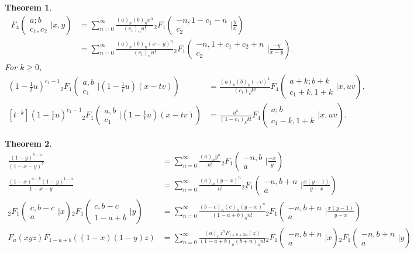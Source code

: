 \documentclass[12pt]{article}
\numberwithin{equation}{section}
\newtheorem{theorem}{Theorem}[section]
\newcommand{\Head}[3] {{}_{#1}{#2}_{#3}}
\newcommand{\ArgS}[3] {( \begin{smallmatrix} #1 \\ #2 \end{smallmatrix} | {#3})}
\newcommand{\HypJ}[2] {F_{#1}(#2)}
\newcommand{\appellFfourS}[6]    {F_4 \ArgS{{#1};{#2}}{{#3},{#4}}{{#5},{#6}}}
\begin{document}
\begin{theorem}
\label{thm_appelF4_sum}
\begin{align*}
\appellFfourS{a}{b}{c_1}{c_2}{x}{y} &= \sum_{n=0}^{\infty} \tfrac{(a)_n (b)_n x^n}{(c_1)_n n!} \Head2F1 \ArgS{-n,1-c_1-n}{c_2}{\tfrac{y}{x}}\\
 &= \sum_{n=0}^{\infty} \tfrac{(a)_n (b)_n (x-y)^n}{(c_1)_n n!} \Head2F1 \ArgS{-n,1+c_1+c_2+n}{c_2}{\tfrac{-y}{x-y}}\text{.}
\end{align*}
For $k \ge 0$,
\begin{align*}
[t^{k}] (1- \tfrac1t u)^{c_1-1} \Head2F1 \ArgS{a,b}{c_1}{(1-\tfrac1t u)(x-t v)} &= \tfrac{(a)_k (b)_k (-v)^k}{(c_1)_k k!} \appellFfourS{a+k}{b+k}{c_1+k}{1+k}{x}{u v}\text{,}\\
[t^{-k}] (1-\tfrac1t u)^{c_1-1} \Head2F1 \ArgS{a,b}{c_1}{(1-\tfrac1t u)(x-t v)} &= \tfrac{u^k}{(1-c_1)_k k!} \appellFfourS{a}{b}{c_1-k}{1+k}{x}{u v}\text{.}
\end{align*}
\end{theorem}


\begin{theorem}
\begin{align*}
\tfrac{(1-y)^{b-a}}{(1-x-y)^b} &= \sum_{n=0}^{\infty} \tfrac{(a)_n y^n}{n!} \Head{2}{F}{1} \ArgS{-n,b}{a}{\tfrac{-x}{y}}\\
\tfrac{(1-x)^{a-b}(1-y)^{1-a}}{1-x-y} &= \sum_{n=0}^{\infty} \tfrac{(a)_n (y-x)^n}{n!} \Head{2}{F}{1} \ArgS{-n,b+n}{a}{\tfrac{x(y-1)}{y-x}}\\
\Head{2}{F}{1} \ArgS{c,b-c}{a}{x} \Head{2}{F}{1} \ArgS{c,b-c}{1-a+b}{y} &= \sum_{n=0}^{\infty} \tfrac{(b-c)_n (c)_n (y-x)^n}{(1-a+b)_n n!} \Head{2}{F}{1} \ArgS{-n,b+n}{a}{\tfrac{x(y-1)}{y-x}}\\
\HypJ{a}{x y z}\HypJ{1-a+b}{(1-x)(1-y)z} &= \sum_{n=0}^{\infty} \tfrac{(a)_n z^n \HypJ{1+b+2n}{z} }{(1-a+b)_n (b+n)_n n!}\Head{2}{F}{1} \ArgS{-n,b+n}{a}{x} \Head2F1\ArgS{-n,b+n}{a}{y}
\end{align*}
\end{theorem}
\end{document}
